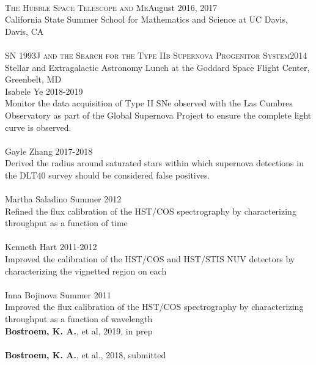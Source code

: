 \documentclass[10pt]{cv}
\begin{document}
\begin{llist}
\\
\textsc{The Hubble Space Telescope and Me}\hfill August 2016, 2017\\
California State Summer School for Mathematics and Science at UC Davis, Davis, CA\\
\\
\textsc{SN 1993J and the Search for the Type IIb Supernova Progenitor System}\hfill 2014\\
Stellar and Extragalactic Astronomy Lunch at the Goddard Space Flight Center, Greenbelt, MD\\
\vspace{-0.1in}  
Isabele Ye \hfill 2018-2019\\
Monitor the data acquisition of Type II SNe observed with the Las Cumbres Observatory 
as part of the Global Supernova Project to ensure the complete light curve is observed.\\
\\
Gayle Zhang \hfill 2017-2018\\
Derived the radius around saturated stars within which supernova detections in 
the DLT40 survey should be considered false positives.\\
\\
\clearpage
Martha Saladino \hfill Summer 2012\\
Refined the flux calibration of the HST/COS spectrography by characterizing  
throughput as a function of time\\
\\
Kenneth Hart \hfill 2011-2012\\
Improved the calibration of the HST/COS and HST/STIS NUV detectors by 
characterizing the vignetted region on each\\
\\
Inna Bojinova \hfill Summer 2011\\
Improved the flux calibration of the HST/COS spectrography by characterizing  
throughput as a function of wavelength\\
%
\vspace{-0.1in}  
{\bf Bostroem, K. A.}, et al, 2019, in prep\\
\\
{\bf Bostroem, K. A.}, et al., 2018, submitted\\
\\

\end{llist}
\end{document}
